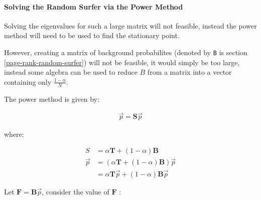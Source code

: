 \documentclass[11pt]{article}
\begin{document}
\paragraph{Solving the Random Surfer via the Power Method}
\label{sec:org0e6a159}
Solving the eigenvalues for such a large matrix will not feasible, instead the power method will need to be used to find the stationary point.

However, creating a matrix of background probabilites (denoted by \texttt{B} is section \ref{page-rank-random-surfer}) will not be feasible, it would simply be too large, instead some algebra can be used to reduce \(B\) from a matrix into a vector containing only \(\frac{1-\alpha}{N}\).

The power method is given by:

\begin{align}
\vec{p}= \mathbf{S} \vec{p}
\end{align}

where:

\begin{align}
S &= \alpha \mathbf{T} +  \left( 1 - \alpha \right) \mathbf{B} \\
\vec{p} &= \left( \alpha \mathbf{T} +  \left( 1 - \alpha \right) \mathbf{B} \right) \vec{p}\\
&= \alpha \mathbf{T}\vec{p} +  \left( 1-\alpha \right) \mathbf{B} \vec{p}
\end{align}

Let \(\mathbf{F}= \mathbf{B}\vec{p}\), consider the value of \(\mathbf{F}\) :
\end{document}

